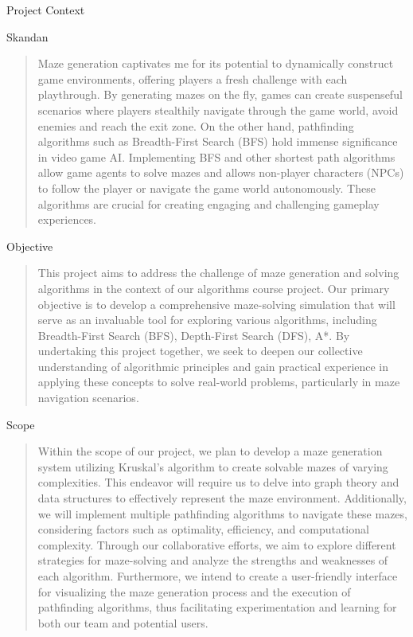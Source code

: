 \documentclass{amsart}
\begin{document}
\begin{section}{Project Context}
\begin{subsection}{Skandan}
\begin{quote}
            Maze generation captivates me for its potential to dynamically construct game environments, offering players a fresh challenge with each playthrough. By generating mazes on the fly, games can create suspenseful scenarios where players stealthily navigate through the game world, avoid enemies and reach the exit zone. On the other hand, pathfinding algorithms such as Breadth-First Search (BFS) hold immense significance in video game AI. Implementing BFS and other shortest path algorithms allow game agents to solve mazes and allows non-player characters (NPCs) to follow the player or navigate the game world autonomously. These algorithms are crucial for creating engaging and challenging gameplay experiences.    
        \end{quote}
    \end{subsection}
    
\end{section}

\begin{section}{Objective}
    \begin{quote}
        This project aims to address the challenge of maze generation and solving algorithms in the context of our algorithms course project. Our primary objective is to develop a comprehensive maze-solving simulation that will serve as an invaluable tool for exploring various algorithms, including Breadth-First Search (BFS), Depth-First Search (DFS), A*. By undertaking this project together, we seek to deepen our collective understanding of algorithmic principles and gain practical experience in applying these concepts to solve real-world problems, particularly in maze navigation scenarios.
    \end{quote}
\end{section}

\begin{section}{Scope}
    \begin{quote}
        Within the scope of our project, we plan to develop a maze generation system utilizing Kruskal's algorithm to create solvable mazes of varying complexities. This endeavor will require us to delve into graph theory and data structures to effectively represent the maze environment. Additionally, we will implement multiple pathfinding algorithms to navigate these mazes, considering factors such as optimality, efficiency, and computational complexity. Through our collaborative efforts, we aim to explore different strategies for maze-solving and analyze the strengths and weaknesses of each algorithm. Furthermore, we intend to create a user-friendly interface for visualizing the maze generation process and the execution of pathfinding algorithms, thus facilitating experimentation and learning for both our team and potential users.
    \end{quote}
\end{section}
\end{document}
